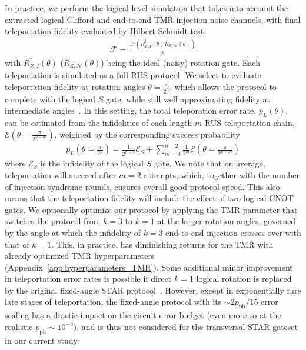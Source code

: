 \documentclass[aps, prx, reprint, superscriptaddress, longbibliography, floatfix]{revtex4-2}
\begin{document}
In practice, we perform the logical-level simulation that takes into account the extracted logical Clifford and end-to-end TMR injection noise channels, with final teleportation fidelity evaluated by Hilbert-Schmidt test:
\begin{align}\label{eq:h_schmidt}
    \mathcal{F}=\frac{\text{Tr} (R^\dagger_{Z,I}(\theta)R_{Z,\mathcal{N}}(\theta))}{2}
\end{align}
with $R^\dagger_{Z,I}(\theta)$ ($R_{Z,\mathcal{N}}(\theta)$) being the ideal (noisy) rotation gate. Each teleportation is simulated as a full  RUS protocol.  We select to evaluate teleportation fidelity at rotation angles $\theta=\frac{\pi}{2^n}$, which allows the protocol to complete with the logical $S$ gate, while still well approximating fidelity at intermediate angles~\cite{Toshio2024}. In this setting, the total teleporation error rate, $p_L(\theta)$, can be estimated from the infidelities of each length-$m$ RUS teleportation chain, $\mathcal{E}\left ( \theta=\frac{\pi}{2^{n-m}} \right )$, weighted by the corresponding success probability
\begin{align}\label{eq:teleport}
    p_L\left ( \theta=\frac{\pi}{2^{n}} \right )=\frac{1}{2^{n-1}}\mathcal{E}_S+\sum_{m=0}^{n-2} \frac{1}{2^m} \mathcal{E}\left ( \theta=\frac{\pi}{2^{n-m}} \right )
\end{align}
where $\mathcal{E}_S$ is the infidelity of the logical $S$ gate. We note that on average, teleportation will succeed after $m=2$ attempts, which, together with the number of injection syndrome rounds, ensures overall good protocol speed. This also means that the teleportation fidelity will include the effect of two logical CNOT gates.  We optionally optimize our protocol by applying the TMR parameter that switches the protocol from $k=3$ to $k=1$ at the larger rotation angles, governed by the angle at which the infidelity of $k=3$ end-to-end injection crosses over with that of $ k=1$. This, in practice, has diminishing returns for the TMR with already optimized TMR hyperparameters (Appendix~\ref{app:hyperparameters_TMR}). Some additional minor improvement in teleportation error rates is possible if direct $k=1$ logical rotation is replaced by the original fixed-angle STAR protocol~\cite{Akahoshi2024}. However, except in exponentially rare late stages of teleportation, the fixed-angle protocol with its $\sim 2p_{\mathrm{ph}}/15$ error scaling has a drastic impact on the circuit error budget (even more so at the realistic $p_{\mathrm{ph}}\sim 10^{-3}$), and is thus not considered for the transversal STAR gateset in our current study. 
\end{document}
